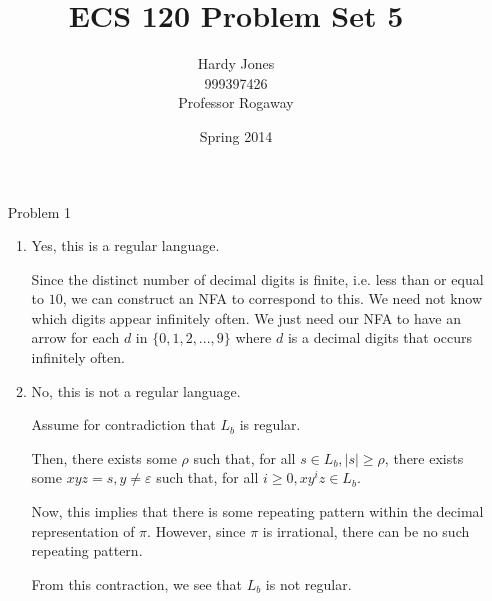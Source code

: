 \documentclass[12pt,letterpaper]{article}
\title{ECS 120 Problem Set 5\vspace{-2ex}}
\author{Hardy Jones\\
        999397426\\
        Professor Rogaway\vspace{-2ex}}
\date{Spring 2014}
\begin{document}
  \maketitle

  \begin{enumerate}
    \item[Problem 1]
      \begin{enumerate}
        \item
          Yes, this is a regular language.

          Since the distinct number of decimal digits is finite, i.e. less than or equal to $10$, we can construct an NFA to correspond to this.
          We need not know which digits appear infinitely often.
          We just need our NFA to have an arrow for each $d$ in $\{0,1,2,...,9\}$ where $d$ is a decimal digits that occurs infinitely often.

        \item
          No, this is not a regular language.

          Assume for contradiction that $L_b$ is regular.

          Then, there exists some $\rho$ such that,
          for all $s \in L_b, |s| \ge \rho$,
          there exists some $xyz = s, y \ne \varepsilon$ such that,
          for all $i \ge 0, xy^iz \in L_b$.

          Now, this implies that there is some repeating pattern within the decimal representation of $\pi$.
          However, since $\pi$ is irrational, there can be no such repeating pattern.

          From this contraction, we see that $L_b$ is not regular.
      \end{enumerate}
  \end{enumerate}
\end{document}
